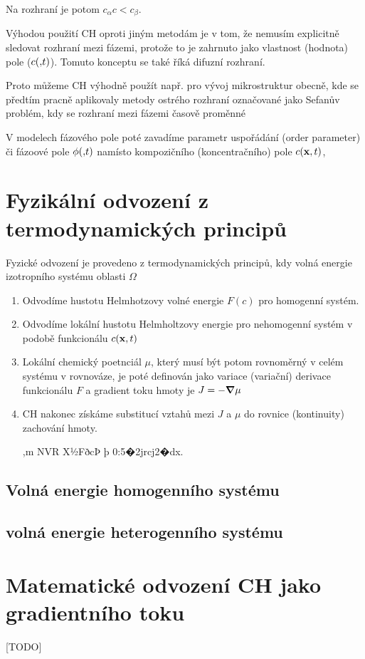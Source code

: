 \documentclass[a4]{article}
\begin{document}
Na rozhraní je potom $c_{\alpha} c < c_{\beta}$.

Výhodou použití CH oproti jiným metodám je v tom, že nemusím explicitně sledovat rozhraní mezi fázemi, protože to 
je zahrnuto jako vlastnost (hodnota) pole ($c(\vb, t)$). Tomuto konceptu se také říká difuzní rozhraní.

Proto můžeme CH výhodně použít např. pro vývoj mikrostruktur obecně, kde se předtím pracně aplikovaly metody ostrého rozhraní označované jako 
Sefanův problém, kdy se rozhraní mezi fázemi časově proměnné 


V modelech fázového pole poté zavadíme parametr uspořádání (order parameter) či fázoové pole $\phi(\vb, t)$ namísto 
kompozičního (koncentračního) pole $c(\vb x, t)$, 

\section{Fyzikální odvození z termodynamických principů}

Fyzické odvození je provedeno z termodynamických principů, kdy volná energie izotropního systému oblasti $\Omega$  

\begin{enumerate}

\item Odvodíme hustotu Helmhotzovy volné energie $F(c)$ pro homogenní systém.

\item Odvodíme lokální hustotu Helmholtzovy energie pro nehomogenní systém v podobě funkcionálu $c(\vb x, t)$

\item Lokální chemický poetnciál $\mu$, který musí být potom rovnoměrný v celém systému v rovnováze, je poté definován jako variace (variační) derivace funkcionálu $F$ a gradient 
toku hmoty je $J = - \grad {\mu}$

\item CH nakonec získáme substitucí vztahů mezi $J$ a $\mu$ do rovnice (kontinuity) zachování hmoty.

\ite,m  NVR X½FðcÞ þ 0:5�2jrcj2�dx. 



\end{enumerate}

\subsection{Volná energie homogenního systému}

\subsection{volná energie heterogenního systému}

\section{Matematické odvození CH jako gradientního toku}

[TODO]
\end{document}
